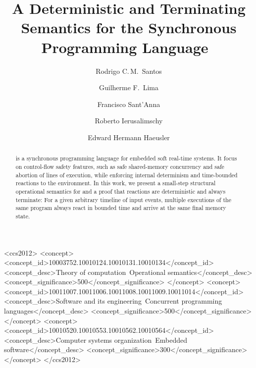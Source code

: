 \documentclass[sigplan, anonymous, review]{acmart}
\begin{document}
\title[A Deterministic and Terminating Semantics for \CEU]
{A Deterministic and Terminating Semantics
  for the Synchronous Programming Language~\CEU}

\author[R.\,C.\,M.~Santos]{Rodrigo C.\,M.~Santos}
%
\author[G.\,F.~Lima]{Guilherme F.~Lima}
%
\author[F.~Sant'Anna]{Francisco Sant'Anna}
%
\author[R.~Ierusalimschy]{Roberto Ierusalimschy}
%
\author[E.\,H.~Haeusler]{Edward Hermann Haeusler}

\begin{abstract}
\CEU is a synchronous programming language for embedded soft real-time systems.
%
It focus on control-flow safety features, such as safe shared-memory
concurrency and safe abortion of lines of execution, while enforcing internal
determinism and time-bounded reactions to the environment.
%
In this work, we present a small-step structural operational semantics for
\CEU and a proof that reactions are deterministic and always terminate:
%
For a given arbitrary timeline of input events, multiple executions of the same
program always react in bounded time and arrive at the same final memory state.
%
\end{abstract}


\begin{CCSXML}
<ccs2012>
 <concept>
  <concept_id>10003752.10010124.10010131.10010134</concept_id>
  <concept_desc>Theory of computation~Operational semantics</concept_desc>
  <concept_significance>500</concept_significance>
 </concept>
 <concept>
  <concept_id>10011007.10011006.10011008.10011009.10011014</concept_id>
  <concept_desc>Software and its
                engineering~Concurrent programming languages</concept_desc>
  <concept_significance>500</concept_significance>
 </concept>
 <concept>
  <concept_id>10010520.10010553.10010562.10010564</concept_id>
  <concept_desc>Computer systems
                organization~Embedded software</concept_desc>
  <concept_significance>300</concept_significance>
 </concept>
</ccs2012>
\end{CCSXML}

\maketitle










\appendix
%
\end{document}
